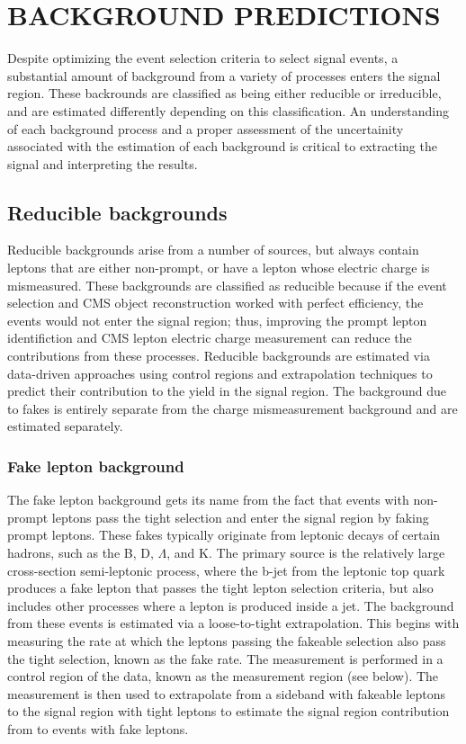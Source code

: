 %
%

\chapter{BACKGROUND PREDICTIONS}
\label{chap:background}
Despite optimizing the event selection criteria to select signal events, a substantial amount of background from a variety of processes enters the signal region.
These backrounds are classified as being either reducible or irreducible, and are estimated differently depending on this classification. An understanding
of each background process and a proper assessment of the uncertainity associated with the estimation of each background is critical to extracting the signal and interpreting
the results. 

\section{Reducible backgrounds}
Reducible backgrounds arise from a number of sources, but always contain leptons that are either non-prompt, or have a lepton whose electric charge is mismeasured.
These backgrounds are classified as reducible because if the event selection and CMS object reconstruction worked with perfect efficiency, the events would not
enter the signal region; thus, improving the prompt lepton identifiction and CMS lepton electric charge measurement can reduce the contributions from these processes.
Reducible backgrounds are estimated via data-driven approaches using control regions and extrapolation techniques to predict their contribution to the yield in the
signal region. The background due to fakes is entirely separate from the charge mismeasurement background and are estimated separately. 

\subsection{Fake lepton background} 
The fake lepton background gets its name from the fact that events with non-prompt leptons pass the tight selection and enter the signal region by faking prompt leptons. These
fakes typically originate from leptonic decays of certain hadrons, such as the B, D, $\Lambda$, and K. The primary source is the relatively large cross-section semi-leptonic \ttbar
process, where the b-jet from the leptonic top quark produces a fake lepton that passes the tight lepton selection criteria, but also includes other processes where a lepton
is produced inside a jet. The background from these events is estimated via a loose-to-tight extrapolation. This begins with measuring the rate at which the leptons passing
the fakeable selection also pass the tight selection, known as the fake rate. The measurement is performed in a control region of the data, known as the measurement region (see below).
The measurement is then used to extrapolate from a sideband with fakeable leptons to the signal region with
tight leptons to estimate the signal region contribution from to events with fake leptons. 

